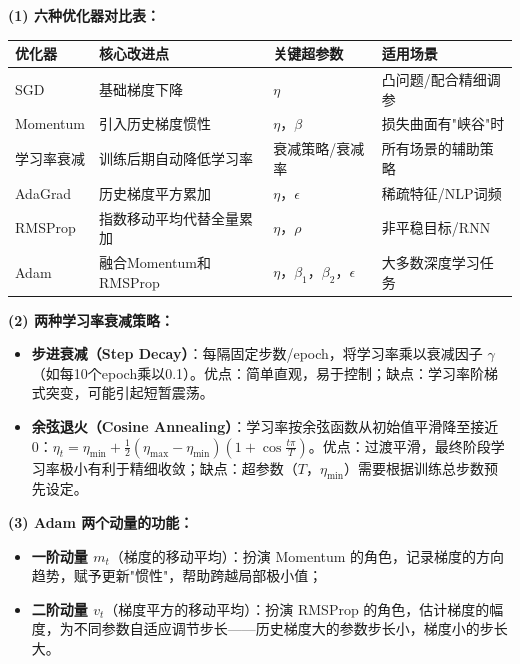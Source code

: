 \documentclass[a4paper,11pt]{ctexart}
\begin{document}
\begin{solutionbox}[参考答案与详细解析]
    \textbf{(1) 六种优化器对比表：}

    \begin{center}
    \begin{tabular}{p{2.2cm} p{4.0cm} p{2.5cm} p{3.0cm}}
        \toprule
        优化器 & 核心改进点 & 关键超参数 & 适用场景 \\
        \midrule
        SGD & 基础梯度下降 & $\eta$ & 凸问题/配合精细调参 \\[0.8em]
        Momentum & 引入历史梯度惯性 & $\eta$，$\beta$ & 损失曲面有"峡谷"时 \\[0.8em]
        学习率衰减 & 训练后期自动降低学习率 & 衰减策略/衰减率 & 所有场景的辅助策略 \\[0.8em]
        AdaGrad & 历史梯度平方累加 & $\eta$，$\epsilon$ & 稀疏特征/NLP词频 \\[0.8em]
        RMSProp & 指数移动平均代替全量累加 & $\eta$，$\rho$ & 非平稳目标/RNN \\[0.8em]
        Adam & 融合Momentum和RMSProp & $\eta$，$\beta_1$，$\beta_2$，$\epsilon$ & 大多数深度学习任务 \\
        \bottomrule
    \end{tabular}
    \end{center}

    \textbf{(2) 两种学习率衰减策略：}

    \begin{itemize}
        \item \textbf{步进衰减（Step Decay）}：每隔固定步数/epoch，将学习率乘以衰减因子 $\gamma$（如每10个epoch乘以0.1）。优点：简单直观，易于控制；缺点：学习率阶梯式突变，可能引起短暂震荡。
        \item \textbf{余弦退火（Cosine Annealing）}：学习率按余弦函数从初始值平滑降至接近0：$\eta_t = \eta_{\min} + \frac{1}{2}(\eta_{\max}-\eta_{\min})(1+\cos\frac{t\pi}{T})$。优点：过渡平滑，最终阶段学习率极小有利于精细收敛；缺点：超参数（$T$，$\eta_{\min}$）需要根据训练总步数预先设定。
    \end{itemize}

    \textbf{(3) Adam 两个动量的功能：}

    \begin{itemize}
        \item \textbf{一阶动量 $m_t$}（梯度的移动平均）：扮演 Momentum 的角色，记录梯度的方向趋势，赋予更新"惯性"，帮助跨越局部极小值；
        \item \textbf{二阶动量 $v_t$}（梯度平方的移动平均）：扮演 RMSProp 的角色，估计梯度的幅度，为不同参数自适应调节步长——历史梯度大的参数步长小，梯度小的步长大。
    \end{itemize}


\end{solutionbox}
\end{document}
